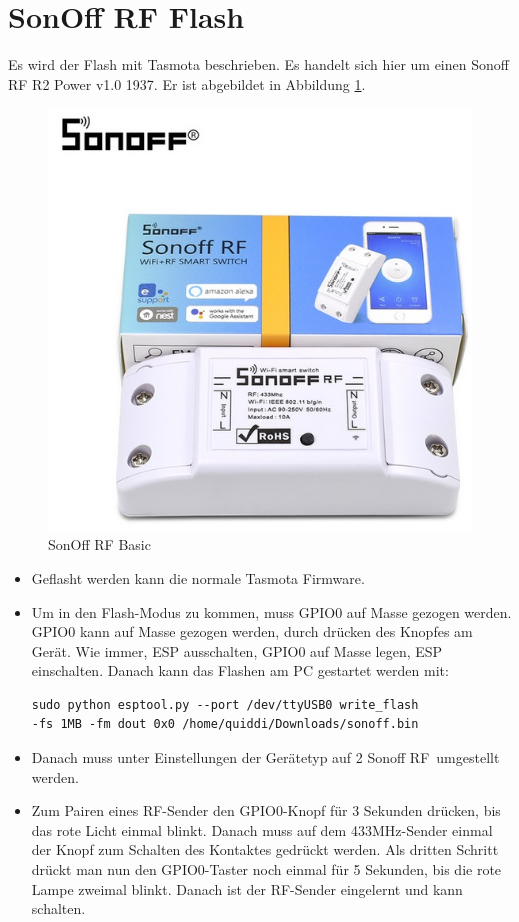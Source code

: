 \documentclass[11pt,fleqn]{book} %
\numberwithin{equation}{section} %
\numberwithin{figure}{section} %
\numberwithin{table}{section} %
\begin{document}
 \section{SonOff RF Flash}
 Es wird der Flash mit Tasmota beschrieben. Es handelt sich hier um einen \glqq Sonoff RF R2 Power v1.0 1937\grqq. Er ist abgebildet in Abbildung \ref{pic:sonoff-rf}.
 \begin{figure}[!h]%
\centering
\includegraphics[scale=0.5]{Pictures/Sonoff-rf-basic.jpg}
\caption{SonOff RF Basic\label{pic:sonoff-rf} }
\end{figure}
 \begin{itemize}
     \item Geflasht werden kann die normale Tasmota Firmware.
     \item Um in den Flash-Modus zu kommen, muss GPIO0 auf Masse gezogen werden. GPIO0 kann auf Masse gezogen werden, durch drücken des Knopfes am Gerät. Wie immer, ESP ausschalten, GPIO0 auf Masse legen, ESP einschalten. Danach kann das Flashen am PC gestartet werden mit: \begin{lstlisting}
sudo python esptool.py --port /dev/ttyUSB0 write_flash
-fs 1MB -fm dout 0x0 /home/quiddi/Downloads/sonoff.bin
\end{lstlisting}
\item Danach muss unter Einstellungen der Gerätetyp auf 2 \glqq Sonoff RF\grqq \ umgestellt werden.
\item Zum Pairen eines RF-Sender den GPIO0-Knopf für 3 Sekunden drücken, bis das rote Licht einmal blinkt. Danach muss auf dem 433MHz-Sender einmal der Knopf zum Schalten des Kontaktes gedrückt werden. Als dritten Schritt drückt man nun den GPIO0-Taster noch einmal für 5 Sekunden, bis die rote Lampe zweimal blinkt. Danach ist der RF-Sender eingelernt und kann schalten.
 \end{itemize}
\end{document}
